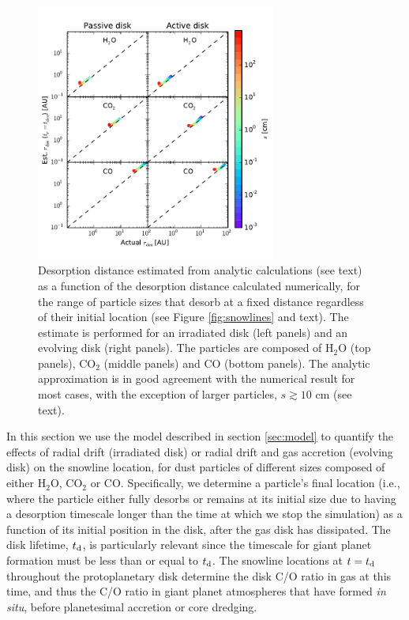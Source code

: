 \documentclass[apj]{emulateapj}
\begin{document}
\begin{figure}[t!]
\centering
\includegraphics[width=0.7\textwidth]{desorption_distance_actual_vs_estimated_passive_active_new.pdf}
\caption{Desorption distance estimated from analytic calculations (see text) as a function of the desorption distance calculated numerically, for the range of particle sizes that desorb at a fixed distance regardless of their initial location (see Figure \ref{fig:snowlines} and text). The estimate is performed for an irradiated disk (left panels) and an evolving disk (right panels).  The particles are composed of H$_2$O (top panels), CO$_2$ (middle panels) and CO (bottom panels). The analytic approximation is in good agreement with the numerical result for most cases, with the exception of larger particles, $s \gtrsim 10$ cm (see text).}
\label{fig:an_vs_actual}
\end{figure}

In this section we use the model described in section \ref{sec:model} to quantify the effects of radial drift (irradiated disk) or radial drift and gas accretion (evolving disk) on the snowline location, for dust particles of different sizes composed of either H$_2$O, CO$_2$ or CO. Specifically, we determine a particle's final location (i.e., where the particle either fully desorbs or remains at its initial size due to having a desorption timescale longer than the time at which we stop the simulation) as a function of its initial position in the disk, after the gas disk has dissipated. The disk lifetime, $t_{\rm d}$, is particularly relevant since the timescale for giant planet formation must be less than or equal to $t_{\rm d}$. The snowline locations at $t=t_{\rm d}$ throughout the protoplanetary disk determine the disk C/O ratio in gas at this time, and thus the C/O ratio in giant planet atmospheres that have formed \textit{in situ}, before planetesimal accretion or core dredging.   
\end{document}
